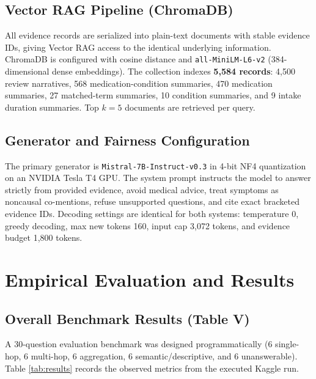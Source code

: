 \documentclass[conference]{IEEEtran}
\begin{document}
\subsection{Vector RAG Pipeline (ChromaDB)}
All evidence records are serialized into plain-text documents with stable evidence IDs, giving Vector RAG access to the identical underlying information. ChromaDB is configured with cosine distance and \texttt{all-MiniLM-L6-v2} (384-dimensional dense embeddings). The collection indexes \textbf{5,584 records}: 4,500 review narratives, 568 medication-condition summaries, 470 medication summaries, 27 matched-term summaries, 10 condition summaries, and 9 intake duration summaries. Top $k=5$ documents are retrieved per query.

\subsection{Generator and Fairness Configuration}
The primary generator is \texttt{Mistral-7B-Instruct-v0.3} in 4-bit NF4 quantization on an NVIDIA Tesla T4 GPU. The system prompt instructs the model to answer strictly from provided evidence, avoid medical advice, treat symptoms as noncausal co-mentions, refuse unsupported questions, and cite exact bracketed evidence IDs. Decoding settings are identical for both systems: temperature 0, greedy decoding, max new tokens 160, input cap 3,072 tokens, and evidence budget 1,800 tokens.

\section{Empirical Evaluation and Results}
\subsection{Overall Benchmark Results (Table V)}
A 30-question evaluation benchmark was designed programmatically (6 single-hop, 6 multi-hop, 6 aggregation, 6 semantic/descriptive, and 6 unanswerable). Table \ref{tab:results} records the observed metrics from the executed Kaggle run.
\end{document}
